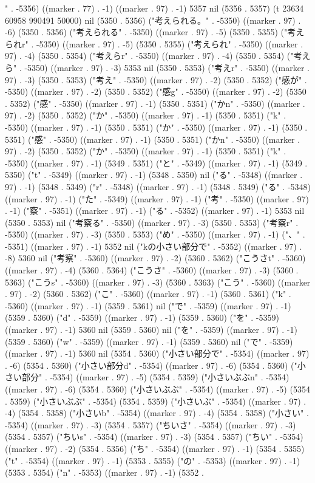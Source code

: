 " . -5356) ((marker . 77) . -1) ((marker . 97) . -1) 5357 nil (5356 . 5357) (t 23634 60958 990491 50000) nil (5350 . 5356) ("考えられる。" . -5350) ((marker . 97) . -6) (5350 . 5356) ("考えられる" . -5350) ((marker . 97) . -5) (5350 . 5355) ("考えられr" . -5350) ((marker . 97) . -5) (5350 . 5355) ("考えられ" . -5350) ((marker . 97) . -4) (5350 . 5354) ("考えらr" . -5350) ((marker . 97) . -4) (5350 . 5354) ("考えら" . -5350) ((marker . 97) . -3) 5353 nil (5350 . 5353) ("考えr" . -5350) ((marker . 97) . -3) (5350 . 5353) ("考え" . -5350) ((marker . 97) . -2) (5350 . 5352) ("感が" . -5350) ((marker . 97) . -2) (5350 . 5352) ("感g" . -5350) ((marker . 97) . -2) (5350 . 5352) ("感" . -5350) ((marker . 97) . -1) (5350 . 5351) ("かn" . -5350) ((marker . 97) . -2) (5350 . 5352) ("か" . -5350) ((marker . 97) . -1) (5350 . 5351) ("k" . -5350) ((marker . 97) . -1) (5350 . 5351) ("か" . -5350) ((marker . 97) . -1) (5350 . 5351) ("感" . -5350) ((marker . 97) . -1) (5350 . 5351) ("かn" . -5350) ((marker . 97) . -2) (5350 . 5352) ("か" . -5350) ((marker . 97) . -1) (5350 . 5351) ("k" . -5350) ((marker . 97) . -1) (5349 . 5351) ("と" . -5349) ((marker . 97) . -1) (5349 . 5350) ("t" . -5349) ((marker . 97) . -1) (5348 . 5350) nil ("る" . -5348) ((marker . 97) . -1) (5348 . 5349) ("r" . -5348) ((marker . 97) . -1) (5348 . 5349) ("る" . -5348) ((marker . 97) . -1) ("た" . -5349) ((marker . 97) . -1) ("考" . -5350) ((marker . 97) . -1) ("察" . -5351) ((marker . 97) . -1) ("る" . -5352) ((marker . 97) . -1) 5353 nil (5350 . 5353) nil ("考察る" . -5350) ((marker . 97) . -3) (5350 . 5353) ("考察r" . -5350) ((marker . 97) . -3) (5350 . 5353) ("め" . -5350) ((marker . 97) . -1) ("、" . -5351) ((marker . 97) . -1) 5352 nil ("kの小さい部分で" . -5352) ((marker . 97) . -8) 5360 nil ("考察" . -5360) ((marker . 97) . -2) (5360 . 5362) ("こうさt" . -5360) ((marker . 97) . -4) (5360 . 5364) ("こうさ" . -5360) ((marker . 97) . -3) (5360 . 5363) ("こうs" . -5360) ((marker . 97) . -3) (5360 . 5363) ("こう" . -5360) ((marker . 97) . -2) (5360 . 5362) ("こ" . -5360) ((marker . 97) . -1) (5360 . 5361) ("k" . -5360) ((marker . 97) . -1) (5359 . 5361) nil ("で" . -5359) ((marker . 97) . -1) (5359 . 5360) ("d" . -5359) ((marker . 97) . -1) (5359 . 5360) ("を" . -5359) ((marker . 97) . -1) 5360 nil (5359 . 5360) nil ("を" . -5359) ((marker . 97) . -1) (5359 . 5360) ("w" . -5359) ((marker . 97) . -1) (5359 . 5360) nil ("で" . -5359) ((marker . 97) . -1) 5360 nil (5354 . 5360) ("小さい部分で" . -5354) ((marker . 97) . -6) (5354 . 5360) ("小さい部分d" . -5354) ((marker . 97) . -6) (5354 . 5360) ("小さい部分" . -5354) ((marker . 97) . -5) (5354 . 5359) ("小さいぶぶn" . -5354) ((marker . 97) . -6) (5354 . 5360) ("小さいぶぶ" . -5354) ((marker . 97) . -5) (5354 . 5359) ("小さいぶぶ" . -5354) (5354 . 5359) ("小さいぶ" . -5354) ((marker . 97) . -4) (5354 . 5358) ("小さいb" . -5354) ((marker . 97) . -4) (5354 . 5358) ("小さい" . -5354) ((marker . 97) . -3) (5354 . 5357) ("ちいさ" . -5354) ((marker . 97) . -3) (5354 . 5357) ("ちいs" . -5354) ((marker . 97) . -3) (5354 . 5357) ("ちい" . -5354) ((marker . 97) . -2) (5354 . 5356) ("ち" . -5354) ((marker . 97) . -1) (5354 . 5355) ("t" . -5354) ((marker . 97) . -1) (5353 . 5355) ("の" . -5353) ((marker . 97) . -1) (5353 . 5354) ("n" . -5353) ((marker . 97) . -1) (5352 . 